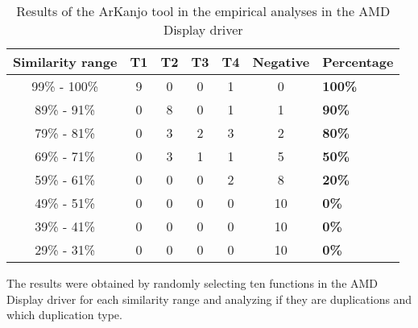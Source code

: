 \begin{table}
\begin{tabular}{ | c | c | c | c | c | c | m{8em} | }

\hline

\textbf{Similarity range} & \textbf{T1} & \textbf{T2} & T3 & T4
& \textbf{Negative} & \textbf{Percentage} \\ \hline 
99\% - 100\% & 9 & 0 & 0 & 1 & 0 & \textbf{100\%} \\ \hline
89\% - 91\% & 0 & 8 & 0 & 1 & 1 & \textbf{90\%} \\ \hline
79\% - 81\% & 0 & 3 & 2 & 3 & 2 & \textbf{80\%} \\ \hline
69\% - 71\% & 0 & 3 & 1 & 1 & 5 & \textbf{50\%} \\ \hline
59\% - 61\% & 0 & 0 & 0 & 2 & 8 & \textbf{20\%} \\ \hline
49\% - 51\% & 0 & 0 & 0 & 0 & 10 & \textbf{0\%} \\ \hline
39\% - 41\% & 0 & 0 & 0 & 0 & 10 & \textbf{0\%} \\ \hline
29\% - 31\% & 0 & 0 & 0 & 0 & 10 & \textbf{0\%} \\ \hline

\hline

\end{tabular}
\caption{Results of the ArKanjo tool in the empirical analyses in the AMD Display driver}
\label{tab:emp}

The results were obtained by randomly selecting ten functions in the AMD Display driver for 
each similarity range and analyzing if they are duplications and which duplication type.

\end{table}
